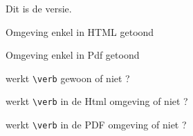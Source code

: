 \documentclass{ximera}
\begin{document}


    Dit is de  versie.


    
    \begin{onlyHtml} 
        Omgeving enkel in HTML getoond
    \end{onlyHtml}

    \begin{onlyPdf} 
        Omgeving enkel in Pdf getoond
    \end{onlyPdf}
        

werkt \verb|\verb| gewoon of niet ?



\begin{onlyHtml} 
werkt \verb!\verb! in de Html omgeving of niet ?
\end{onlyHtml}

\begin{onlyPdf}
werkt \verb|\verb| in de PDF omgeving of niet ?
\end{onlyPdf}
\end{document}
